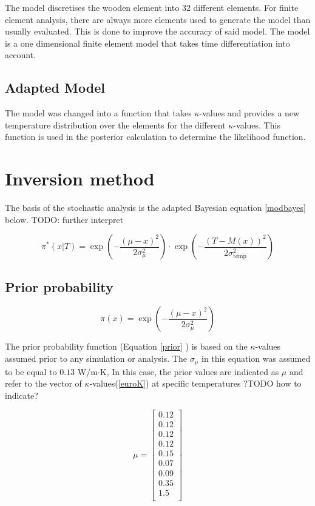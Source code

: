 	The model discretises the wooden element into 32 different elements. For finite element analysis, there are always more elements used to generate the model than usually evaluated. This is done to improve the accuracy of said model.
	The model is a one dimensional finite element model that takes time differentiation into account.
	
	\subsection{Adapted Model}	
	The model was changed into a function that takes $\kappa$-values and provides a new temperature distribution over the elements for the different $\kappa$-values. 
	This function is used in the posterior calculation to determine the likelihood function.
	

\section{Inversion method}
The basis of the stochastic analysis is the adapted Bayesian equation \ref{modbayes} below. 
TODO: further interpret

\begin{equation}
\label{modbayes}
\pi^* (x|T) = \exp\left(-\frac{(\mu - x)^2}{2\sigma_{\mu}^2}\right) \cdot \exp\left(-\frac{\left(T-M(x)\right)^2}{2\sigma_{\text{temp}}^2}\right)
\end{equation}

	\subsection{Prior probability}
	
	\begin{equation}
	\label{prior}
	\pi(x) = \exp\left(-\frac{(\mu - x)^2}{2\sigma_{\mu}^2}\right)
	\end{equation}

	The prior probability function (Equation \ref{prior} ) is based on the $\kappa$-values assumed prior to any simulation or analysis. 
	The $\sigma_{\mu}$ in this equation was assumed to be equal to $0.13$ W/m$\cdot$K,
	In this case, the prior values are indicated as $\mu$ and refer to the vector of $\kappa$-values(\ref{euroK}) at specific temperatures ?TODO how to indicate?
	
	\begin{equation}
	\label{euroK}
	\mu =
		\begin{bmatrix}
		0.12\\ 
		0.12\\ 
		0.12\\ 
		0.12\\ 
		0.15\\ 
		0.07\\
		0.09\\ 
		0.35\\ 
		1.5\\
		\end{bmatrix}
	\end{equation}
	

